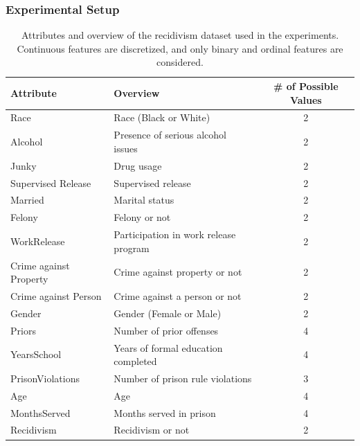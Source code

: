 \documentclass[runningheads]{llncs}
\begin{document}
\subsubsection{Experimental Setup}\label{sec:exp_setting}
{%
  \renewcommand{\arraystretch}{1.05}
  \begin{table}[tbp]
    \centering
    \caption[Attributes and overview of the recidivism dataset used in the experiments]{%
      Attributes and overview of the recidivism dataset used in the experiments. Continuous features are discretized, and only binary and ordinal features are considered.
    }\label{tab:rcdv}
    \begin{tabular}{llc}
      \toprule
      Attribute              & Overview                              & \# of Possible Values \\
      \midrule
      Race                   & Race (Black or White)                 & 2                     \\
      Alcohol                & Presence of serious alcohol issues    & 2                     \\
      Junky                  & Drug usage                            & 2                     \\
      Supervised Release     & Supervised release                    & 2                     \\
      Married                & Marital status                        & 2                     \\
      Felony                 & Felony or not                         & 2                     \\
      WorkRelease            & Participation in work release program & 2                     \\
      Crime against Property & Crime against property or not         & 2                     \\
      Crime against Person   & Crime against a person or not         & 2                     \\
      Gender                 & Gender (Female or Male)               & 2                     \\
      Priors                 & Number of prior offenses              & 4                     \\
      YearsSchool            & Years of formal education completed   & 4                     \\
      PrisonViolations       & Number of prison rule violations      & 3                     \\
      Age                    & Age                                   & 4                     \\
      MonthsServed           & Months served in prison               & 4                     \\
      \midrule
      Recidivism             & Recidivism or not                     & 2                     \\
      \bottomrule
    \end{tabular}
  \end{table}
}
\end{document}
